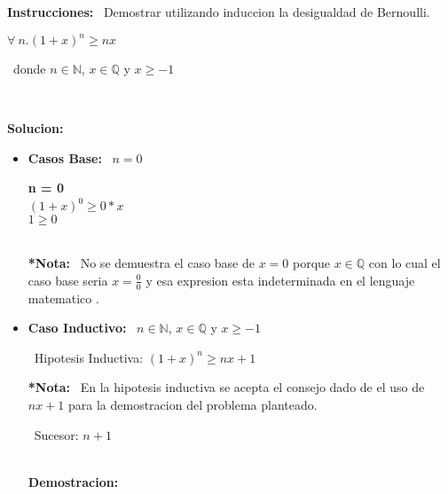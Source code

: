 \documentclass[10pt,a4paper]{article}
\begin{document}
\begin{large}
\textbf{Instrucciones:} \ {Demostrar utilizando induccion la desigualdad de Bernoulli.}
\end{large}

\begin{center}
$ \forall\ n.(1+x)^n \geq nx $
\end{center}
\
donde $n\in \mathbb{N}$, $x\in \mathbb{Q}$ y $x\geq -1$

\
\\\begin{large}
\textbf{Solucion: }
\end{large}

\begin{itemize}
\item \textbf{Casos Base:} \ $ n=0 $ \  
\begin{center}
\textbf{n = 0}
\
\\$ (1+x)^0 \geq 0*x $
\
\\$ 1 \geq 0 $


\
\\\textbf{*Nota:} \ No se demuestra el caso base de $ x = 0 $ porque $ x\in \mathbb{Q}$  con lo cual el caso base seria $ x = \frac{0}{0}$ y esa expresion esta indeterminada en el lenguaje matematico .
\end{center}

\item \textbf{Caso Inductivo:} \ $n\in \mathbb{N}$, $ x\in \mathbb{Q}$ y $x\geq -1$

\ Hipotesis Inductiva: $ (1+x)^n \geq nx + 1 $

\textbf{*Nota:} \ En la hipotesis inductiva se acepta el consejo dado de el uso de $ nx + 1 $ para la demostracion del problema planteado.

\ Sucesor: $ n+1 $

\
\\\textbf{Demostracion:}
\
\\ 
\end{itemize}
\end{document}
